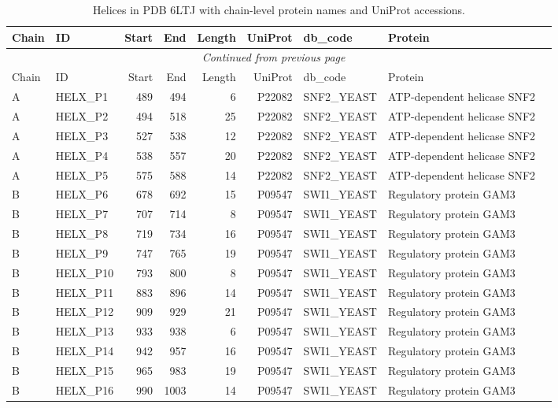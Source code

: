 \begin{longtable}{@{}llrrrrllp{5.2cm}@{}}
  \toprule
  Chain & ID & Start & End & Length & UniProt & db\_code & Protein \\
  \midrule
  \endfirsthead
  \multicolumn{8}{c}{\textit{Continued from previous page}} \\
  \toprule
  Chain & ID & Start & End & Length & UniProt & db\_code & Protein \\
  \midrule
  \endhead
  \bottomrule
  \endfoot
  \bottomrule
  \caption{Helices in PDB 6LTJ with chain-level protein names and UniProt accessions.}
  \label{tab:6ltj_helices_uniprot}
  \endlastfoot
  A & HELX_P1 & 489 & 494 & 6 & P22082 & SNF2_YEAST & ATP-dependent helicase SNF2 \\
  A & HELX_P2 & 494 & 518 & 25 & P22082 & SNF2_YEAST & ATP-dependent helicase SNF2 \\
  A & HELX_P3 & 527 & 538 & 12 & P22082 & SNF2_YEAST & ATP-dependent helicase SNF2 \\
  A & HELX_P4 & 538 & 557 & 20 & P22082 & SNF2_YEAST & ATP-dependent helicase SNF2 \\
  A & HELX_P5 & 575 & 588 & 14 & P22082 & SNF2_YEAST & ATP-dependent helicase SNF2 \\
  B & HELX_P6 & 678 & 692 & 15 & P09547 & SWI1_YEAST & Regulatory protein GAM3 \\
  B & HELX_P7 & 707 & 714 & 8 & P09547 & SWI1_YEAST & Regulatory protein GAM3 \\
  B & HELX_P8 & 719 & 734 & 16 & P09547 & SWI1_YEAST & Regulatory protein GAM3 \\
  B & HELX_P9 & 747 & 765 & 19 & P09547 & SWI1_YEAST & Regulatory protein GAM3 \\
  B & HELX_P10 & 793 & 800 & 8 & P09547 & SWI1_YEAST & Regulatory protein GAM3 \\
  B & HELX_P11 & 883 & 896 & 14 & P09547 & SWI1_YEAST & Regulatory protein GAM3 \\
  B & HELX_P12 & 909 & 929 & 21 & P09547 & SWI1_YEAST & Regulatory protein GAM3 \\
  B & HELX_P13 & 933 & 938 & 6 & P09547 & SWI1_YEAST & Regulatory protein GAM3 \\
  B & HELX_P14 & 942 & 957 & 16 & P09547 & SWI1_YEAST & Regulatory protein GAM3 \\
  B & HELX_P15 & 965 & 983 & 19 & P09547 & SWI1_YEAST & Regulatory protein GAM3 \\
  B & HELX_P16 & 990 & 1003 & 14 & P09547 & SWI1_YEAST & Regulatory protein GAM3 \\

\end{longtable}
